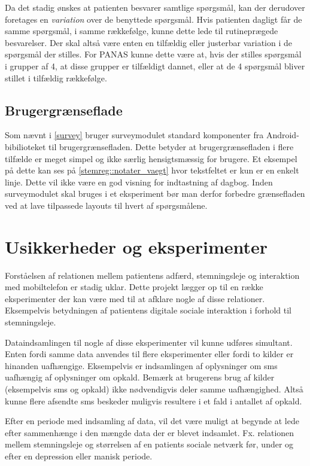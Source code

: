 Da det stadig ønskes at patienten besvarer samtlige spørgsmål, kan der derudover foretages en \emph{variation} over de benyttede spørgsmål.
Hvis patienten dagligt får de samme spørgsmål, i samme rækkefølge, kunne dette lede til rutineprægede besvarelser.
Der skal altså være enten en tilfældig eller justerbar variation i de spørgsmål der stilles.
For PANAS kunne dette være at, hvis der stilles spørgsmål i grupper af 4, at disse grupper er tilfældigt dannet, eller at de 4 spørgsmål bliver stillet i tilfældig rækkefølge.

\subsection{Brugergrænseflade}
Som nævnt i \cref{survey} bruger surveymodulet standard komponenter fra Android-bibilioteket til brugergrænsefladen.
Dette betyder at brugergrænsefladen i flere tilfælde er meget simpel og ikke særlig hensigtsmæssig for brugere.
Et eksempel på dette kan ses på \cref{stemreg::notater_vaegt} hvor tekstfeltet er kun er en enkelt linje.
Dette vil ikke være en god visning for indtastning af dagbog.
Inden surveymodulet skal bruges i et eksperiment bør man derfor forbedre grænsefladen ved at lave tilpassede layouts til hvert af spørgsmålene.


\section{Usikkerheder og eksperimenter}\label{refleksion:usikkerhed}
Forståelsen af relationen mellem patientens adfærd, stemningsleje og interaktion med mobiltelefon er stadig uklar.
Dette projekt lægger op til en række eksperimenter der kan være med til at afklare nogle af disse relationer.
Eksempelvis betydningen af patientens digitale sociale interaktion i forhold til stemningsleje.

Dataindsamlingen til nogle af disse eksperimenter vil kunne udføres simultant.
Enten fordi samme data anvendes til flere eksperimenter eller fordi to kilder er hinanden uafhængige.
Eksempelvis er indsamlingen af oplysninger om sms uafhængig af oplysninger om opkald.
Bemærk at brugerens brug af kilder (eksempelvis sms og opkald) ikke nødvendigvis deler samme uafhængighed.
Altså kunne flere afsendte sms beskeder muligvis resultere i et fald i antallet af opkald.

Efter en periode med indsamling af data, vil det være muligt at begynde at lede efter sammenhænge i den mængde data der er blevet indsamlet.
Fx. relationen mellem stemningsleje og størrelsen af en patients sociale netværk før, under og efter en depression eller manisk periode.

